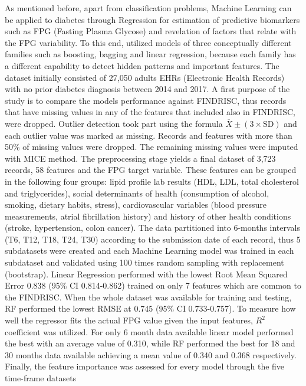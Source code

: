 \documentclass[journal,article,submit,pdftex,moreauthors]{Definitions/mdpi}
\begin{document}
\par As mentioned before, apart from classification problems, Machine Learning
can be applied to diabetes through Regression for estimation of predictive
biomarkers such as FPG (Fasting Plasma Glycose) and revelation of factors that
relate with the FPG variability. To this end, \cite{kopitar2020early} utilized
models of three conceptually different families such as boosting, bagging and
linear regression, because each family has a different capability to detect 
hidden patterns and important features. The dataset initially consisted of 
27,050 adults EHRs (Electronic Health Records) with no prior diabetes diagnosis
between 2014 and 2017. A first purpose of the study is to compare the models
performance against FINDRISC, thus records that have missing values in any of
the features that included also in FINDRISC, were dropped. Outlier detection took part using the formula
$\overline{X} \pm(3 \times \textrm{SD})$ and each outlier value was marked as
missing. Records and features with more than 50\% of missing
values were dropped. The remaining missing values were imputed with
MICE method. The preprocessing stage yields a final dataset of 3,723
records, 58 features and the FPG target variable. These features can be grouped
in the following four groups: lipid profile lab results (HDL, LDL, total 
cholesterol and triglycerides), social determinants of health (consumption of 
alcohol, smoking, dietary habits, stress), cardiovascular variables (blood 
pressure measurements, atrial fibrillation history) and history of other health
conditions (stroke, hypertension, colon cancer). The data partitioned 
into 6-months intervals (T6, T12, T18, T24, T30) 
according to the submission date of each record, thus 5 subdatasets were created
and each Machine Learning model was trained in each subdataset and validated using
100 times random sampling with replacement (bootstrap). Linear Regression performed with 
the lowest Root Mean Squared Error 0.838 (95\% CI 0.814-0.862) trained on only 7 
features which are common to the FINDRISC. When the whole dataset was available for training and testing, RF performed the lowest RMSE at 0.745 
(95\% CI 0.733-0.757). To measure how well the regressor fits the actual FPG value given the input features,
$R^{2}$ coefficient was utilized.
For only 6 month data available linear model performed the best with an average value of 
0.310, while RF performed the best for 18 and 30 months data available achieving a 
mean value of 0.340 and 0.368 respectively. Finally, the feature 
importance was assessed for every model through the five time-frame datasets
\end{document}
